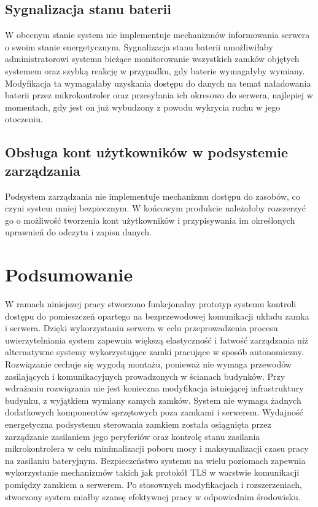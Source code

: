         \subsection{Sygnalizacja stanu baterii}

            W obecnym stanie system nie implementuje mechanizmów informowania serwera o swoim stanie energetycznym.
            Sygnalizacja stanu baterii umożliwiłaby administratorowi systemu bieżące monitorowanie wszystkich zamków objętych systemem oraz szybką reakcję w przypadku, gdy baterie wymagałyby wymiany. Modyfikacja ta wymagałaby uzyskania dostępu do danych na temat naładowania baterii przez mikrokontroler oraz przesyłania ich okresowo do serwera, najlepiej w momentach, gdy jest on już wybudzony z powodu wykrycia ruchu w jego otoczeniu.

        \subsection{Obsługa kont użytkowników w podsystemie zarządzania}

            Podsystem zarządzania nie implementuje mechanizmu dostępu do zasobów, co czyni system mniej bezpiecznym. W końcowym produkcie należałoby rozszerzyć go o możliwość tworzenia kont użytkowników i przypisywania im określonych uprawnień do odczytu i zapisu danych.

    \section{Podsumowanie}

        W ramach niniejszej pracy stworzono funkcjonalny prototyp systemu kontroli dostępu do pomieszczeń opartego na bezprzewodowej komunikacji układu zamka i serwera. Dzięki wykorzystaniu serwera w celu przeprowadzenia procesu uwierzytelniania system zapewnia większą elastyczność i łatwość zarządzania niż alternatywne systemy wykorzystujące zamki pracujące w sposób autonomiczny. Rozwiązanie cechuje się wygodą montażu, ponieważ nie wymaga przewodów zasilających i komunikacyjnych prowadzonych w ścianach budynków. Przy wdrażaniu rozwiązania nie jest konieczna modyfikacja istniejącej infrastruktury budynku, z wyjątkiem wymiany samych zamków. System nie wymaga żadnych dodatkowych komponentów sprzętowych poza zamkami i serwerem. Wydajność energetyczna podsystemu sterowania zamkiem została osiągnięta przez zarządzanie zasilaniem jego peryferiów oraz kontrolę stanu zasilania mikrokontrolera w celu minimalizacji poboru mocy i maksymalizacji czasu pracy na zasilaniu bateryjnym. Bezpieczeństwo systemu na wielu poziomach zapewnia wykorzystanie mechanizmów takich jak protokół TLS w warstwie komunikacji pomiędzy zamkiem a serwerem. Po stosownych modyfikacjach i rozszerzeniach, stworzony system miałby szansę efektywnej pracy w odpowiednim środowisku.